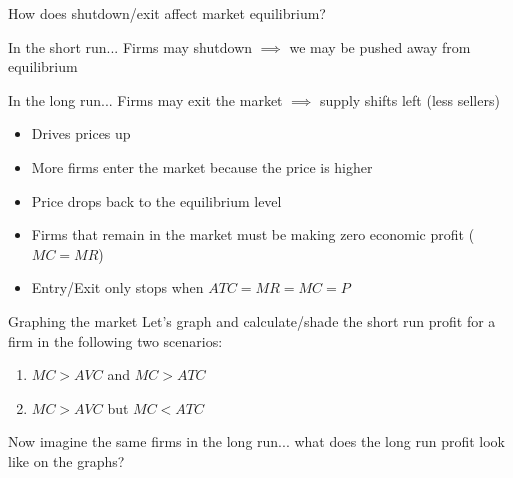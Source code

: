 \documentclass[compress]{beamer}
\begin{document}
\begin{frame}{How does shutdown/exit affect market equilibrium?}
    \begin{block}{In the short run...}
        Firms may shutdown $\implies$ we may be pushed away from equilibrium
    \end{block}

    \begin{block}{In the long run...}
        Firms may exit the market $\implies$ supply shifts left (less sellers)
        \begin{itemize}
            \item Drives prices up
            \item More firms enter the market because the price is higher
            \item Price drops back to the equilibrium level
        \end{itemize}

        \begin{itemize}
            \item Firms that remain in the market must be making zero economic profit ($MC = MR$)
            \item Entry/Exit only stops when $ATC = MR = MC = P$
        \end{itemize}
    \end{block}
\end{frame}

\begin{frame}{Graphing the market}
    Let's graph and calculate/shade the short run profit for a firm in the following two scenarios:

    \vspace{3mm}
    
    \begin{enumerate}
        \item $MC > AVC$ and $MC > ATC$
        \item $MC > AVC$ but $MC < ATC$
    \end{enumerate}

    \vspace{6mm}

    Now imagine the same firms in the long run... what does the long run profit look like on the graphs?
\end{frame}
\end{document}
